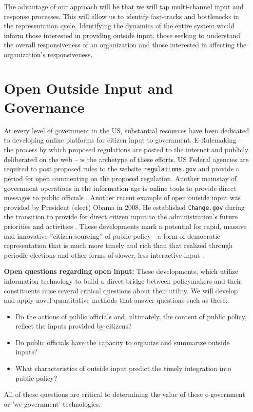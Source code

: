 The advantage of our approach will be that we will tap multi-channel input and response processes. This will allow us to identify fast-tracks and bottlenecks in the representation cycle. Identifying the dynamics of the entire system would inform those interested in providing outside input, those seeking to understand the overall responsiveness of an organization and those interested in affecting the organization's responsiveness.



\section{Open Outside Input and Governance}

At every level of government in the US, substantial resources have been dedicated to developing online platforms for citizen input to government. E-Rulemaking \cite{Coglianese2004} -- the process by which proposed regulations are posted to the internet and publicly deliberated on the web -- is the archetype of these efforts. US Federal agencies are required to post proposed rules to the website \texttt{regulations.gov} and provide a period for open commenting on the proposed regulation. Another mainstay of government operations in the information age is online tools to provide direct messages to public officials \cite{Balla2007}. Another recent example of open outside input was provided by President (elect) Obama in 2008. He established \texttt{Change.gov} during the transition to provide for direct citizen input to the administration's future priorities and activities \cite{Borins2009}. These developments mark a potential for rapid, massive and innovative ''citizen-sourcing'' of public policy - a form of democratic representation that is much more timely and rich than that realized through periodic elections and other forms of slower, less interactive input  \cite{Linders2012}.  

{\bf Open questions regarding open input:} These developments, which utilize information technology to build a direct bridge between policymakers and their constituents raise several critical questions about their utility. We will develop and apply novel quantitative methods that answer questions such as these: 
\begin{itemize}
\item Do the actions of public officials and, ultimately, the content of public policy, reflect the inputs provided by citizens? 
\item Do public officials have the capacity to organize and summarize outside inputs? 
\item What characteristics of outside input predict the timely integration into public policy?
\end{itemize} All of these questions are critical to determining the value of these e-government or 'we-government' technologies.


